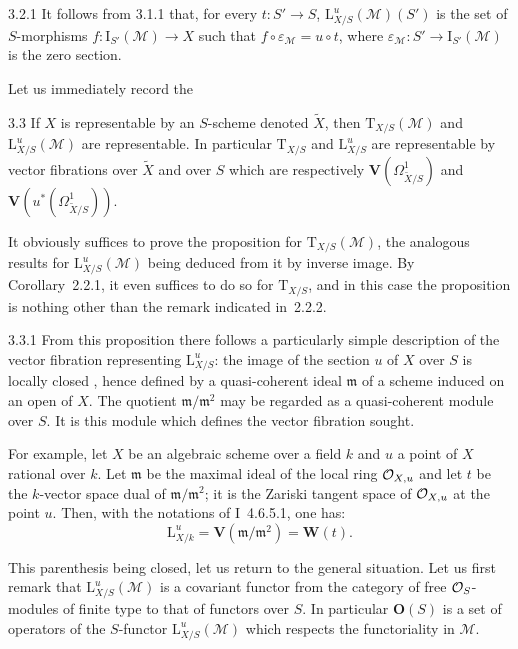 \begin{remark}{3.2.1}
\label{II.3.2.1}
{\renewcommand{\thefootnote}{(17)}}
It follows from 3.1.1 that, for every \(t\colon S'\to S\),
\(\mathrm{L}^{u}_{X/S}(\mathcal{M})(S')\) is the set of \(S\)-morphisms
\(f\colon\mathrm{I}_{S'}(\mathcal{M})\to X\) such that
\(f\circ\varepsilon_{\mathcal{M}}=u\circ t\), where
\(\varepsilon_{\mathcal{M}}\colon S'\to\mathrm{I}_{S'}(\mathcal{M})\) is the
zero section.
\end{remark}

Let us immediately record the

\begin{proposition}{3.3}
\label{II.3.3}
If \(X\) is representable by an \(S\)-scheme denoted \(\widetilde{X}\), then
\(\mathrm{T}_{X/S}(\mathcal{M})\) and \(\mathrm{L}^{u}_{X/S}(\mathcal{M})\) are
representable. In particular \(\mathrm{T}_{X/S}\) and
\(\mathrm{L}^{u}_{X/S}\) are representable by vector fibrations over
\(\widetilde{X}\) and over \(S\) which are respectively
\(\mathbf{V}(\Omega^1_{\widetilde{X}/S})\) and
\(\mathbf{V}(u^*(\Omega^1_{\widetilde{X}/S}))\).
\end{proposition}

It obviously suffices to prove the proposition for
\(\mathrm{T}_{X/S}(\mathcal{M})\), the analogous results for
\(\mathrm{L}^{u}_{X/S}(\mathcal{M})\) being deduced from it by inverse image.
By Corollary~2.2.1, it even suffices to do so for \(\mathrm{T}_{X/S}\), and
in this case the proposition is nothing other than the remark indicated
in~2.2.2.

\begin{remark}{3.3.1}
\label{II.3.3.1}
From this proposition there follows a particularly simple description of the
vector fibration representing \(\mathrm{L}^{u}_{X/S}\): the image of the
section \(u\) of \(X\) over \(S\) is locally closed%
{\renewcommand{\thefootnote}{(18)}},
hence defined by a quasi-coherent ideal \(\mathfrak{m}\) of a scheme induced
on an open of \(X\). The quotient \(\mathfrak{m}/\mathfrak{m}^2\) may be
regarded as a quasi-coherent module over \(S\). It is this module which
defines the vector fibration sought.

For example, let \(X\) be an algebraic scheme over a field \(k\) and \(u\) a
point of \(X\) rational over \(k\). Let \(\mathfrak{m}\) be the maximal ideal
of the local ring \(\mathcal{O}_{X,u}\) and let \(t\) be the \(k\)-vector space dual
of \(\mathfrak{m}/\mathfrak{m}^2\); it is the Zariski tangent space of
\(\mathcal{O}_{X,u}\) at the point \(u\). Then, with the notations of I~4.6.5.1, one
has:
\[
\mathrm{L}^{u}_{X/k}=\mathbf{V}(\mathfrak{m}/\mathfrak{m}^2)=\mathbf{W}(t).
\]

This parenthesis being closed, let us return to the general situation. Let us
first remark that \(\mathrm{L}^{u}_{X/S}(\mathcal{M})\) is a covariant functor
from the category of free \(\mathcal{O}_S\)-modules of finite type to that of functors
over \(S\). In particular \(\mathbf{O}(S)\) is a set of operators of the
\(S\)-functor \(\mathrm{L}^{u}_{X/S}(\mathcal{M})\) which respects the
functoriality in \(\mathcal{M}\).%
{\renewcommand{\thefootnote}{(19)}}
\end{remark}

